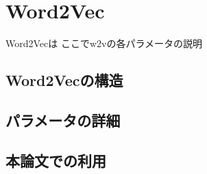 \section{Word2Vec}
Word2Vec\cite{word2vec}は
ここでw2vの各パラメータの説明
\subsection{Word2Vecの構造}
\subsection{パラメータの詳細}
\subsection{本論文での利用}
